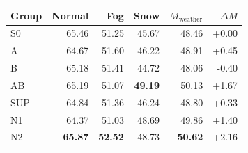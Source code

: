 \begin{tabular}{|l|r|r|r|r|r|}
\hline
Group & Normal & Fog & Snow & $M_{\mathrm{weather}}$ & $\Delta M$ \\
\hline
S0 & 65.46 & 51.25 & 45.67 & 48.46 & +0.00 \\
A & 64.67 & 51.60 & 46.22 & 48.91 & +0.45 \\
B & 65.18 & 51.41 & 44.72 & 48.06 & -0.40 \\
AB & 65.19 & 51.07 & \textbf{49.19} & 50.13 & +1.67 \\
SUP & 64.84 & 51.36 & 46.24 & 48.80 & +0.33 \\
N1 & 64.37 & 51.03 & 48.69 & 49.86 & +1.40 \\
N2 & \textbf{65.87} & \textbf{52.52} & 48.73 & \textbf{50.62} & +2.16 \\
\hline
\end{tabular}

